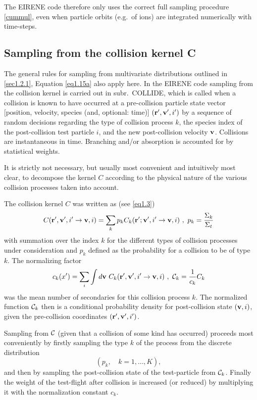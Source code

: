 The EIRENE code therefore only uses the correct full sampling procedure
\cref{cummul}, even when particle orbits (e.g.\ of ions) are integrated
numerically with time-steps.

\subsection{Sampling from the collision kernel C} \label{sec1.2.4}

The general rules for sampling from multivariate distributions outlined in
\cref{sec1.2.1}, Equation \cref{eq1.15a} also apply here.
In the EIRENE code sampling from the collision kernel is carried out in subr.\
COLLIDE, which is called when a collision is known to have occurred at a
pre-collision particle state vector [position, velocity, species (and,
    optional: time)] $( \mathbf{r} ', \mathbf{v} ', i ')$ by a sequence of random decisions
regarding the type of collision process $k$, the species index of the
post-collision test particle $i$, and the new post-collision velocity $\mathbf{v}$.
Collisions are instantaneous in time.
Branching and/or absorption is accounted for by statistical weights.

It is strictly not necessary, but usually most convenient and intuitively most
clear, to decompose the kernel $C$ according to the physical nature of the
various collision processes taken into account.

The collision kernel $C$ was written as (see \cref{eq1.3})
\begin{displaymath}
  C( \mathbf{r} ', \mathbf{v} ', i '	  \rightarrow \mathbf{v}, i) = \sum_{k} {p_k  C_k ( \mathbf{r} ' ; \mathbf{v} ', i '   \rightarrow \mathbf{v}, i)} \ , \ p_k = \frac{\Sigma_k}{\Sigma_t}
\end{displaymath}
with summation over the index $k$ for the different types of
collision processes under consideration and $p_k$ defined as the probability
for a collision to be of type $k$.
The normalizing factor
\begin{displaymath}
  c_k (x ') = \sum_{i}  \int d \mathbf{v} \
  C_k ( \mathbf{r} ', \mathbf{v} ', i ' \rightarrow \mathbf{v}, i ) \ , \  {\cal{C}}_k = \frac{1}{c_k}
  C_k
\end{displaymath}
was the mean number of secondaries for this collision
process $k$.
The normalized function $ {\cal{C}}_k$ then is a conditional probability
density for post-collision state $(\mathbf{v},i)$, given the pre-collision coordinates
$(\mathbf{r}',\mathbf{v}',i')$.

Sampling from $\cal{C}$ (given that a collision of some kind has occurred)
proceeds most conveniently by firstly sampling the type $k$ of the process from
the discrete distribution
\begin{displaymath}
  (p_k, \quad k = 1, \dots, K),
\end{displaymath}
and then by sampling the post-collision state of the
test-particle from ${\cal{C}}_k$.
Finally the weight of the test-flight after collision is increased (or reduced)
by multiplying it with the normalization constant $c_k$.

